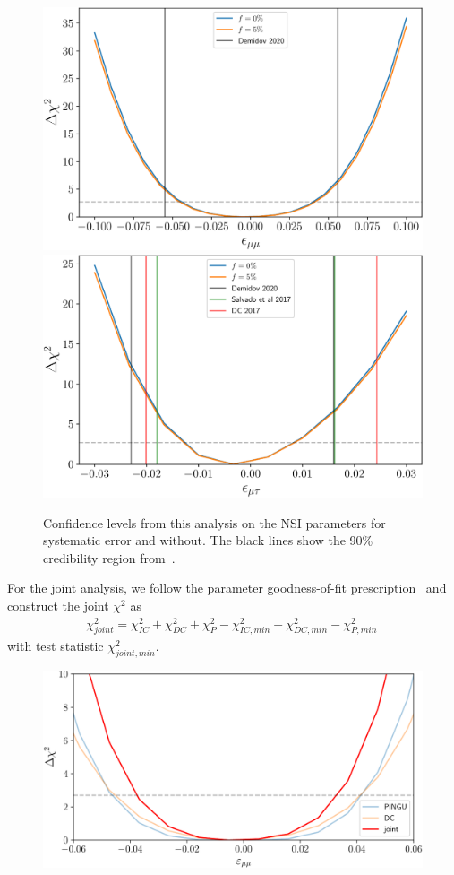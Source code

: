 \documentclass[draft=True]{revtex4-2}
\begin{document}
 \begin{figure}[!tb]
    \begin{center}
       \includegraphics[width=0.4\linewidth]{figures/DC_emm.pdf}
       \includegraphics[width=0.4\linewidth]{figures/DC_emt.pdf}
    \end{center}
    \caption{Confidence levels from this analysis on the NSI
    parameters for systematic error and without. The black lines show the 90\% credibility region from~\cite{demidov}.}\label{fig:DC_chisq}
 \end{figure}

For the joint analysis, we follow the parameter goodness-of-fit prescription~\cite{maltoni2003} and construct the joint $\chi^2$ as 
\begin{align}
    \chi^2_{joint} = \chi^2_{IC} + \chi^2_{DC} + \chi^2_{P} - \chi^2_{IC,min} - \chi^2_{DC,min} - \chi^2_{P,min}\,
\end{align}
with test statistic $\chi^2_{joint,min}$.

\begin{figure}[!tb]
    \begin{center}
       \includegraphics[width=0.4\linewidth]{figures/emm_deltachi.pdf}
    \end{center}
    \caption{}\label{fig:emm_deltachi}
 \end{figure}
\end{document}
